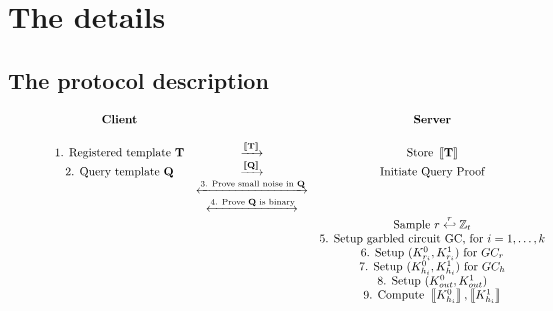 \section{The details}
\label{sec:4thProcDetails}

\subsection{The protocol description}
\label{sec:4thprocSteps}
    
\begin{figure}[h!]
  \centering
    \begin{equation*}
        \begin{array}{c c c}
        \text{\textbf{Client}} & & \text{\textbf{Server}} \\
          \\
          \text{1. Registered template \textbf{T}} & \xrightarrow{\left\llbracket\mathbf{T}\right\rrbracket} & \text{Store } \left\llbracket\mathbf{T}\right\rrbracket\\
          
          \text{2. Query template \textbf{Q}} & \xrightarrow{\left\llbracket\mathbf{Q}\right\rrbracket} & \text{Initiate Query Proof}\\

                               & \xleftrightarrow{\text{3. Prove small noise in \textbf{Q}}} & \\

                               & \xleftrightarrow{\text{4. Prove \textbf{Q} is binary}} & \\

                               & & \text{Sample \(r \stackrel{r}{\hookleftarrow}\mathbb{Z}_{t}\)}\\
                               & & \text{5. Setup garbled circuit GC, for } i = 1,\dots,k \\

                               & & \text{6. Setup } (K^{0}_{r_{i}}, K^{1}_{r_{i}}) \text{ for } GC_r \\
          
                               & & \text{7. Setup } (K^{0}_{h_{i}}, K^{1}_{h_{i}}) \text{ for } GC_{h}\\
          
                               & & \text{8. Setup } (K^{0}_{out}, K^{1}_{out}) \\

                               & & \text{9. Compute } \left\llbracket K^0_{h_i}\right\rrbracket,\left\llbracket K^1_{h_i}\right\rrbracket\\
          \\


\end{array}
\end{equation*}
\end{figure}
